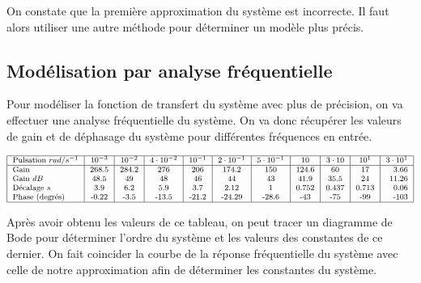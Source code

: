 \documentclass[12pt]{report}
\begin{document}
On constate que la première approximation du système est incorrecte. Il faut alors utiliser
une autre méthode pour déterminer un modèle plus précis.



\subsection{Modélisation par analyse fréquentielle}

Pour modéliser la fonction de transfert du système avec plus de précision, on va
effectuer une analyse fréquentielle du système. On va donc récupérer les valeurs de 
gain et de déphasage du système pour différentes fréquences en entrée.

\begin{equation}
\footnotesize
\begin{tabular}{| l | c | c | c | c | c | c | c | c | c | r |}
  \hline
  Pulsation $rad/s^{-1}$ & $10^{-3}$ & $10^{-2}$ & $4 \cdot 10^{-2}$ & $10^{-1}$ & $2 \cdot 10^{-1}$ & $5 \cdot 10^{-1}$ & $ 10 $ & $ 3 \cdot 10 $ & $ 10^1 $ & $ 3 \cdot 10^1 $  \\
  \hline
  Gain & 268.5 & 284.2 & 276 & 206 & 174.2 & 150 & 124.6 & 60 & 17 & 3.66 \\
  Gain $dB$ & 48.5 & 49 & 48 & 46 & 44 & 43 & 41.9 & 35.5 & 24 & 11.26 \\
  Décalage $s$ & 3.9 & 6.2 & 5.9 & 3.7 & 2.12 & 1 & 0.752 & 0.437 & 0.713 & 0.06 \\
  Phase (degrés) & -0.22 & -3.5 & -13.5 & -21.2 & -24.29 & -28.6 & -43 & -75 & -99 & -103 \\
  \hline
\end{tabular}
\end{equation}

Après avoir obtenu les valeurs de ce tableau, on peut tracer un diagramme de Bode pour
déterminer l'ordre du système et les valeurs des constantes de ce dernier. On fait 
coincider la courbe de la réponse fréquentielle du système avec celle de notre approximation
afin de déterminer les constantes du système.

\newpage
\end{document}

